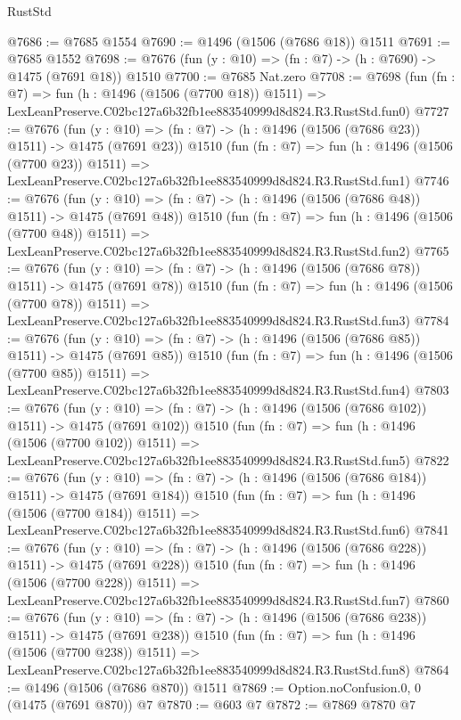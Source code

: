 \begin{lexlean}{RustStd}
\begin{coremodule}
@7686 := @7685 @1554
@7690 := @1496 (@1506 (@7686 @18)) @1511
@7691 := @7685 @1552
@7698 := @7676 (fun (y : @10) => (fn : @7) -> (h : @7690) -> @1475 (@7691 @18)) @1510
@7700 := @7685 Nat.zero
@7708 := @7698
    (fun (fn : @7) =>
    fun (h : @1496 (@1506 (@7700 @18)) @1511) =>
    LexLeanPreserve.C02bc127a6b32fb1ee883540999d8d824.R3.RustStd.fun0)
@7727 := @7676
    (fun (y : @10) => (fn : @7) -> (h : @1496 (@1506 (@7686 @23)) @1511) -> @1475 (@7691 @23))
    @1510
    (fun (fn : @7) =>
    fun (h : @1496 (@1506 (@7700 @23)) @1511) =>
    LexLeanPreserve.C02bc127a6b32fb1ee883540999d8d824.R3.RustStd.fun1)
@7746 := @7676
    (fun (y : @10) => (fn : @7) -> (h : @1496 (@1506 (@7686 @48)) @1511) -> @1475 (@7691 @48))
    @1510
    (fun (fn : @7) =>
    fun (h : @1496 (@1506 (@7700 @48)) @1511) =>
    LexLeanPreserve.C02bc127a6b32fb1ee883540999d8d824.R3.RustStd.fun2)
@7765 := @7676
    (fun (y : @10) => (fn : @7) -> (h : @1496 (@1506 (@7686 @78)) @1511) -> @1475 (@7691 @78))
    @1510
    (fun (fn : @7) =>
    fun (h : @1496 (@1506 (@7700 @78)) @1511) =>
    LexLeanPreserve.C02bc127a6b32fb1ee883540999d8d824.R3.RustStd.fun3)
@7784 := @7676
    (fun (y : @10) => (fn : @7) -> (h : @1496 (@1506 (@7686 @85)) @1511) -> @1475 (@7691 @85))
    @1510
    (fun (fn : @7) =>
    fun (h : @1496 (@1506 (@7700 @85)) @1511) =>
    LexLeanPreserve.C02bc127a6b32fb1ee883540999d8d824.R3.RustStd.fun4)
@7803 := @7676
    (fun (y : @10) => (fn : @7) -> (h : @1496 (@1506 (@7686 @102)) @1511) -> @1475 (@7691 @102))
    @1510
    (fun (fn : @7) =>
    fun (h : @1496 (@1506 (@7700 @102)) @1511) =>
    LexLeanPreserve.C02bc127a6b32fb1ee883540999d8d824.R3.RustStd.fun5)
@7822 := @7676
    (fun (y : @10) => (fn : @7) -> (h : @1496 (@1506 (@7686 @184)) @1511) -> @1475 (@7691 @184))
    @1510
    (fun (fn : @7) =>
    fun (h : @1496 (@1506 (@7700 @184)) @1511) =>
    LexLeanPreserve.C02bc127a6b32fb1ee883540999d8d824.R3.RustStd.fun6)
@7841 := @7676
    (fun (y : @10) => (fn : @7) -> (h : @1496 (@1506 (@7686 @228)) @1511) -> @1475 (@7691 @228))
    @1510
    (fun (fn : @7) =>
    fun (h : @1496 (@1506 (@7700 @228)) @1511) =>
    LexLeanPreserve.C02bc127a6b32fb1ee883540999d8d824.R3.RustStd.fun7)
@7860 := @7676
    (fun (y : @10) => (fn : @7) -> (h : @1496 (@1506 (@7686 @238)) @1511) -> @1475 (@7691 @238))
    @1510
    (fun (fn : @7) =>
    fun (h : @1496 (@1506 (@7700 @238)) @1511) =>
    LexLeanPreserve.C02bc127a6b32fb1ee883540999d8d824.R3.RustStd.fun8)
@7864 := @1496 (@1506 (@7686 @870)) @1511
@7869 := Option.noConfusion.{0, 0} (@1475 (@7691 @870)) @7
@7870 := @603 @7
@7872 := @7869 @7870 @7

\end{coremodule}
\end{lexlean}
